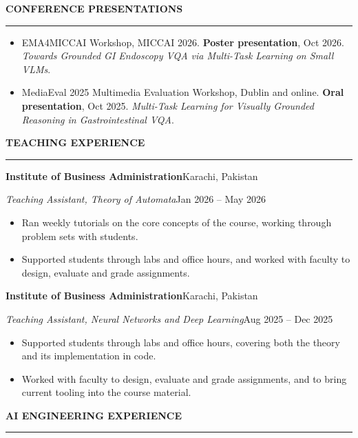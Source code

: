 \documentclass[11pt,letterpaper]{article}
\newcommand{\cvsection}[1]{%
  \Needspace*{6\baselineskip}%
  \vspace{1.0em}%
  {\bfseries\uppercase{#1}}\par
  \vspace{0.15em}\hrule\vspace{0.5em}%
}
\newenvironment{entrybox}
  {\par\vspace{0.5em}\noindent\begin{minipage}{\linewidth}}
  {\end{minipage}\par}
\newcommand{\orgline}[2]{\textbf{#1}\hfill #2\par}
\newcommand{\roleline}[2]{\textit{#1}\hfill #2\par\vspace{0.15em}}
\begin{document}
\cvsection{Conference Presentations}

\begin{entrybox}
\begin{itemize}
  \item EMA4MICCAI Workshop, MICCAI 2026. \textbf{Poster presentation}, Oct 2026.
        \textit{Towards Grounded GI Endoscopy VQA via Multi-Task Learning on Small VLMs}.
  \item MediaEval 2025 Multimedia Evaluation Workshop, Dublin and online.
        \textbf{Oral presentation}, Oct 2025. \textit{Multi-Task Learning for Visually Grounded
        Reasoning in Gastrointestinal VQA}.
\end{itemize}
\end{entrybox}

\cvsection{Teaching Experience}

\begin{entrybox}
  \orgline{Institute of Business Administration}{Karachi, Pakistan}
  \roleline{Teaching Assistant, Theory of Automata}{Jan 2026 -- May 2026}
  \begin{itemize}
    \item Ran weekly tutorials on the core concepts of the course, working through problem sets
          with students.
    \item Supported students through labs and office hours, and worked with faculty to design,
          evaluate and grade assignments.
  \end{itemize}
\end{entrybox}

\begin{entrybox}
  \orgline{Institute of Business Administration}{Karachi, Pakistan}
  \roleline{Teaching Assistant, Neural Networks and Deep Learning}{Aug 2025 -- Dec 2025}
  \begin{itemize}
    \item Supported students through labs and office hours, covering both the theory and its
          implementation in code.
    \item Worked with faculty to design, evaluate and grade assignments, and to bring current
          tooling into the course material.
  \end{itemize}
\end{entrybox}

\cvsection{AI Engineering Experience}
\end{document}

